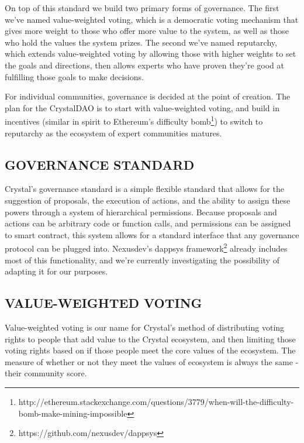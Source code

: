 On top of this standard we build two primary forms of governance. The
first we've named value-weighted voting, which is a democratic voting
mechanism that gives more weight to those who offer more value to the
system, as well as those who hold the values the system prizes. The
second we've named reputarchy, which extends value-weighted voting by
allowing those with higher weights to set the goals and directions, then
allows experts who have proven they're good at fulfilling those goals to
make decisions.

For individual communities, governance is decided at the point of
creation. The plan for the CrystalDAO is to start with value-weighted
voting, and build in incentives (similar in spirit to Ethereum's
difficulty bomb\footnote{http://ethereum.stackexchange.com/questions/3779/when-will-the-difficulty-bomb-make-mining-impossible})
to switch to reputarchy as the ecosystem of expert communities matures.

\subsection{\texorpdfstring{\protect\hypertarget{_5f0ybphephcy}{}{\protect\hypertarget{_Toc462050416}{}{}}GOVERNANCE
STANDARD}{GOVERNANCE STANDARD}}\label{governance-standard}

Crystal's governance standard is a simple flexible standard that allows
for the suggestion of proposals, the execution of actions, and the
ability to assign these powers through a system of hierarchical
permissions. Because proposals and actions can be arbitrary code or
function calls, and permissions can be assigned to smart contract, this
system allows for a standard interface that any governance protocol can
be plugged into. Nexusdev's dappsys framework\footnote{https://github.com/nexusdev/dappsys}
already includes most of this functionality, and we're currently
investigating the possibility of adapting it for our purposes.

\subsection{\texorpdfstring{\protect\hypertarget{_1ovimyyiwxnm}{}{\protect\hypertarget{_Toc462050417}{}{}}VALUE-WEIGHTED
VOTING}{VALUE-WEIGHTED VOTING}}\label{value-weighted-voting}

Value-weighted voting is our name for Crystal's method of distributing
voting rights to people that add value to the Crystal ecosystem, and
then limiting those voting rights based on if those people meet the core
values of the ecosystem. The measure of whether or not they meet the
values of ecosystem is always the same - their community score.


